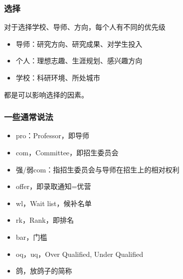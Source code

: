 \begin{frame}
	\frametitle{选择}

	对于选择学校、导师、方向，每个人有不同的优先级

	\begin{itemize}
		\item 导师：研究方向、研究成果、对学生投入
		\item 个人：理想志趣、生涯规划、感兴趣方向
		\item 学校：科研环境、所处城市
	\end{itemize}
	都是可以影响选择的因素。
\end{frame}

\begin{frame}
	\frametitle{一些通常说法}

	\begin{itemize}
		\item pro：Professor，即导师
		\item com，Committee，即招生委员会
		\item 强/弱com：指招生委员会与导师在招生上的相对权利
		\item offer，即录取通知=优营
		\item wl，Wait list，候补名单
		\item rk，Rank，即排名
		\item bar，门槛
		\item oq，uq，Over Qualified, Under Qualified
		\item 鸽，放鸽子的简称
	\end{itemize}

\end{frame}

